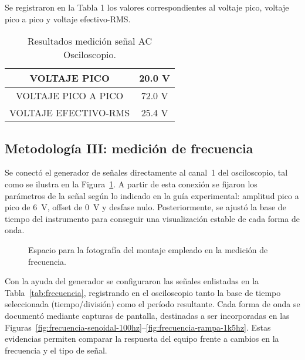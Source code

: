 \documentclass[conference]{IEEEtran} %
\begin{document}
Se registraron en la Tabla 1 los valores correspondientes al voltaje pico, voltaje pico a pico y voltaje efectivo-RMS.
\begin{table}[H]
    \centering
    \caption{Resultados medición señal AC Osciloscopio.}
    \label{tab:ejemplo}
    \begin{tabular}{|c|c|}
        \hline
        VOLTAJE PICO & 20.0 V  \\ \hline
        VOLTAJE PICO A PICO    & 72.0 V     \\ \hline
        VOLTAJE EFECTIVO-RMS   & 25.4 V     \\ \hline
    \end{tabular}
\end{table}

\subsection{Metodología III: medición de frecuencia}
Se conectó el generador de señales directamente al canal~1 del osciloscopio, tal como se ilustra en la Figura~\ref{fig:montaje-frecuencia}. A partir de esta conexión se fijaron los parámetros de la señal según lo indicado en la guía experimental: amplitud pico a pico de \SI{6}{\volt}, offset de \SI{0}{\volt} y desfase nulo. Posteriormente, se ajustó la base de tiempo del instrumento para conseguir una visualización estable de cada forma de onda.

\begin{figure}[H]
    \centering
    \framebox[0.75\linewidth]{\rule{0pt}{3.5cm}}
    \caption{Espacio para la fotografía del montaje empleado en la medición de frecuencia.}
    \label{fig:montaje-frecuencia}
\end{figure}

Con la ayuda del generador se configuraron las señales enlistadas en la Tabla~\ref{tab:frecuencia}, registrando en el osciloscopio tanto la base de tiempo seleccionada (tiempo/división) como el período resultante. Cada forma de onda se documentó mediante capturas de pantalla, destinadas a ser incorporadas en las Figuras~\ref{fig:frecuencia-senoidal-100hz}--\ref{fig:frecuencia-rampa-1k5hz}. Estas evidencias permiten comparar la respuesta del equipo frente a cambios en la frecuencia y el tipo de señal.
\end{document}

